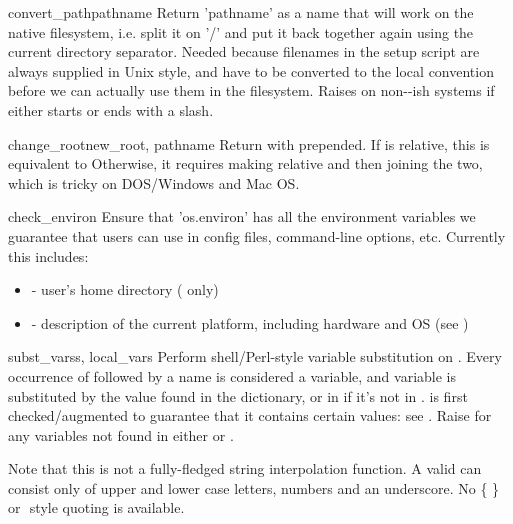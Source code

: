 \documentclass{manual}
\begin{document}
\begin{funcdesc}{convert_path}{pathname}
Return 'pathname' as a name that will work on the native filesystem,
i.e. split it on '/' and put it back together again using the current
directory separator.  Needed because filenames in the setup script are
always supplied in Unix style, and have to be converted to the local
convention before we can actually use them in the filesystem.  Raises
 on non-\UNIX-ish systems if  either 
starts or ends with a slash.
\end{funcdesc}

\begin{funcdesc}{change_root}{new_root, pathname}
Return  with  prepended.  If  is
relative, this is equivalent to 
Otherwise, it requires making  relative and then joining the
two, which is tricky on DOS/Windows and Mac OS.
\end{funcdesc}

\begin{funcdesc}{check_environ}{}
Ensure that 'os.environ' has all the environment variables we
guarantee that users can use in config files, command-line options,
etc.  Currently this includes:
\begin{itemize}
\item {} - user's home directory (\UNIX{} only)
\item {} - description of the current platform, including
      hardware and OS (see )
\end{itemize}
\end{funcdesc}

\begin{funcdesc}{subst_vars}{s, local_vars}
Perform shell/Perl-style variable substitution on .  Every
occurrence of \code{\$} followed by a name is considered a variable, and
variable is substituted by the value found in the 
dictionary, or in  if it's not in .
 is first checked/augmented to guarantee that it contains
certain values: see .  Raise  
for any variables not found in either  or .

Note that this is not a fully-fledged string interpolation function. A
valid  can consist only of upper and lower case letters,
numbers and an underscore. No \{ \} or \( \) style quoting is available.
\end{funcdesc}
\end{document}
